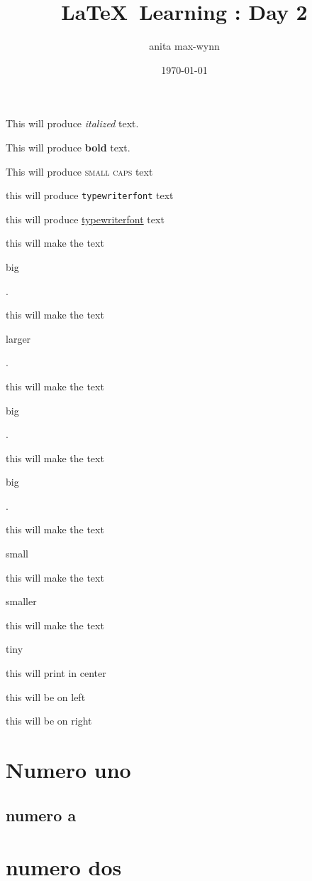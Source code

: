 \documentclass[12pt]{article}
\title{\LaTeX\ Learning : Day 2}
\author{anita max-wynn}
\date{\today}
\begin{document}
\maketitle


This will produce \textit{italized} text.

This will produce \textbf{bold} text.

This will produce \textsc{small caps} text

this will produce \texttt{typewriterfont} text

this will produce \href{http://google.com}{typewriterfont} text

this will make the text \begin{large}
big
\end{large}.

this will make the text \begin{Large}
larger
\end{Large}.

this will make the text \begin{huge}
big
\end{huge}.

this will make the text \begin{Huge}
big
\end{Huge}.

this will make the text \begin{small}
small
\end{small}

this will make the text \begin{scriptsize}
smaller
\end{scriptsize}

this will make the text \begin{tiny}
tiny
\end{tiny}

\vspace{1cm}

\begin{center}
this will print in center
\end{center}

\begin{flushleft}
this will be on left
\end{flushleft}


\begin{flushright}
this will be on right
\end{flushright}

\section{Numero uno}

\subsection{numero a}

\section{numero dos}
\end{document}
